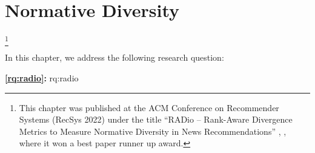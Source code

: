 
\chapter{Normative Diversity}
\label{chapter:research-radio}

\footnote[]{This chapter was published at the ACM Conference on Recommender Systems (RecSys 2022) under the title ``RADio – Rank-Aware Divergence Metrics to Measure Normative Diversity in News Recommendations'' \citep{radio}, , where it won a best paper runner up award.}
\acresetall

In this chapter, we address the following research question:

\medskip
\noindent
\textbf{\ref{rq:radio}:} \acl{rq:radio}
\medskip

\noindent





% 
% 
% 
% 
% 
% 
% 


